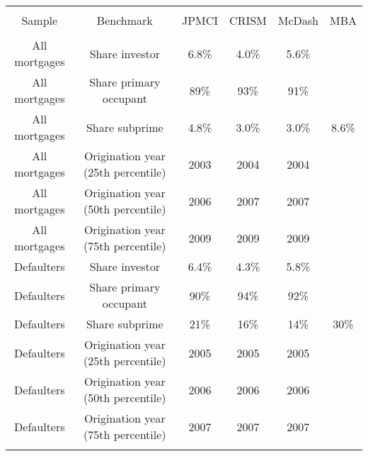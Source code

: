 
\begin{tabular}{@{\extracolsep{5pt}} cccccc} 
\\[-1.8ex]\hline 
\hline \\[-1.8ex] 
Sample & Benchmark & JPMCI & CRISM & McDash & MBA \\ 
\hline \\[-1.8ex] 
All mortgages & Share investor & 6.8\% & 4.0\% & 5.6\% &  \\ 
All mortgages & Share primary occupant & 89\% & 93\% & 91\% &  \\ 
All mortgages & Share subprime & 4.8\% & 3.0\% & 3.0\% & 8.6\% \\ 
All mortgages & Origination year (25th percentile) & 2003 & 2004 & 2004 &  \\ 
All mortgages & Origination year (50th percentile) & 2006 & 2007 & 2007 &  \\ 
All mortgages & Origination year (75th percentile) & 2009 & 2009 & 2009 &  \\ 
Defaulters & Share investor & 6.4\% & 4.3\% & 5.8\% &  \\ 
Defaulters & Share primary occupant & 90\% & 94\% & 92\% &  \\ 
Defaulters & Share subprime & 21\% & 16\% & 14\% & 30\% \\ 
Defaulters & Origination year (25th percentile) & 2005 & 2005 & 2005 &  \\ 
Defaulters & Origination year (50th percentile) & 2006 & 2006 & 2006 &  \\ 
Defaulters & Origination year (75th percentile) & 2007 & 2007 & 2007 &  \\ 
\hline \\[-1.8ex] 
\end{tabular} 

